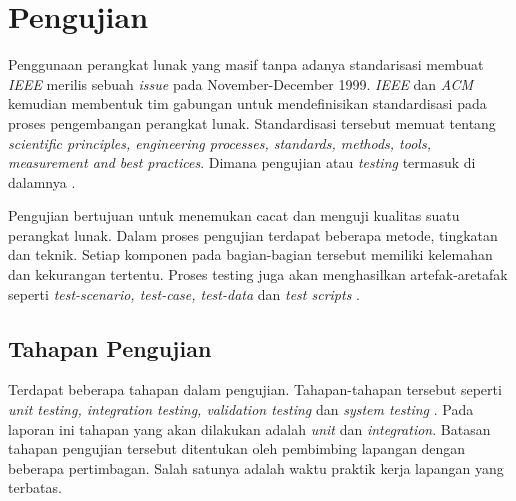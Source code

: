 

\section{Pengujian}


Penggunaan perangkat lunak yang masif tanpa adanya standarisasi
membuat \emph{IEEE} merilis sebuah \emph{issue} pada November-December
1999. \emph{IEEE} dan \emph{ACM} kemudian membentuk tim gabungan untuk
mendefinisikan standardisasi pada proses pengembangan perangkat
lunak. Standardisasi tersebut memuat tentang \emph{scientific
  principles, engineering processes, standards, methods, tools,
  measurement and best practices}. Dimana pengujian atau
\emph{testing} termasuk di dalamnya
\parencite{burnstein2006practical}.

Pengujian bertujuan untuk menemukan cacat dan menguji kualitas suatu
perangkat lunak. Dalam proses pengujian terdapat beberapa metode,
tingkatan dan teknik. Setiap komponen pada bagian-bagian tersebut memiliki
kelemahan dan kekurangan tertentu. Proses testing juga akan
menghasilkan artefak-aretafak seperti \emph{test-scenario, test-case,
  test-data} dan \emph{test scripts} \parencite{burnstein2006practical}.

\subsection{Tahapan Pengujian}

Terdapat beberapa tahapan dalam pengujian. Tahapan-tahapan tersebut
seperti \emph{unit testing, integration testing, validation testing}
dan \emph{system testing} \parencite{presman2010software}. Pada
laporan ini tahapan yang akan dilakukan adalah \emph{unit} dan
\emph{integration}. Batasan tahapan pengujian tersebut ditentukan oleh
pembimbing lapangan dengan beberapa pertimbagan. Salah satunya adalah
waktu praktik kerja lapangan yang terbatas.

